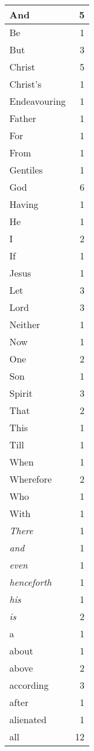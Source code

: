 \begin{center}
\begin{longtable}{l|r}
And & 5\\ \hline 
Be & 1\\ \hline 
But & 3\\ \hline 
Christ & 5\\ \hline 
Christ's & 1\\ \hline 
Endeavouring & 1\\ \hline 
Father & 1\\ \hline 
For & 1\\ \hline 
From & 1\\ \hline 
Gentiles & 1\\ \hline 
God & 6\\ \hline 
Having & 1\\ \hline 
He & 1\\ \hline 
I & 2\\ \hline 
If & 1\\ \hline 
Jesus & 1\\ \hline 
Let & 3\\ \hline 
Lord & 3\\ \hline 
Neither & 1\\ \hline 
Now & 1\\ \hline 
One & 2\\ \hline 
Son & 1\\ \hline 
Spirit & 3\\ \hline 
That & 2\\ \hline 
This & 1\\ \hline 
Till & 1\\ \hline 
When & 1\\ \hline 
Wherefore & 2\\ \hline 
Who & 1\\ \hline 
With & 1\\ \hline 
\emph{There} & 1\\ \hline 
\emph{and} & 1\\ \hline 
\emph{even} & 1\\ \hline 
\emph{henceforth} & 1\\ \hline 
\emph{his} & 1\\ \hline 
\emph{is} & 2\\ \hline 
a & 1\\ \hline 
about & 1\\ \hline 
above & 2\\ \hline 
according & 3\\ \hline 
after & 1\\ \hline 
alienated & 1\\ \hline 
all & 12\\ \hline 

\end{longtable}
\end{center}
